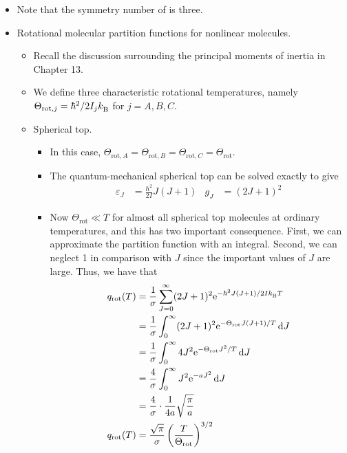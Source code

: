 \documentclass[../notes.tex]{subfiles}
\begin{document}
\begin{itemize}
\begin{itemize}
    \end{itemize}
    \item Note that the symmetry number of  is three.
    \item Rotational molecular partition functions for nonlinear molecules.
    \begin{itemize}
        \item Recall the discussion surrounding the principal moments of inertia in Chapter 13.
        \item We define three characteristic rotational temperatures, namely $\Theta_{\text{rot},j}=\hbar^2/2I_j\kB$ for $j=A,B,C$.
        \item Spherical top.
        \begin{itemize}
            \item In this case, $\Theta_{\text{rot},A}=\Theta_{\text{rot},B}=\Theta_{\text{rot},C}=\Theta_\text{rot}$.
            \item The quantum-mechanical spherical top can be solved exactly to give
            \begin{align*}
                \varepsilon_J &= \frac{\hbar^2}{2I}J(J+1)&
                g_J &= (2J+1)^2
            \end{align*}
            \item Now $\Theta_\text{rot}\ll T$ for almost all spherical top molecules at ordinary temperatures, and this has two important consequence. First, we can approximate the partition function with an integral. Second, we can neglect 1 in comparison with $J$ since the important values of $J$ are large. Thus, we have that
            \begingroup
            \allowdisplaybreaks
            \begin{align*}
                q_\text{rot}(T) &= \frac{1}{\sigma}\sum_{J=0}^\infty(2J+1)^2\e[-\hbar^2J(J+1)/2I\kB T]\\
                &= \frac{1}{\sigma}\int_0^\infty(2J+1)^2\e[-\Theta_\text{rot}J(J+1)/T]\dd{J}\\
                &= \frac{1}{\sigma}\int_0^\infty 4J^2\e[-\Theta_\text{rot}J^2/T]\dd{J}\\
                &= \frac{4}{\sigma}\int_0^\infty J^2\e[-aJ^2]\dd{J}\\
                &= \frac{4}{\sigma}\cdot\frac{1}{4a}\sqrt{\frac{\pi}{a}}\\
                q_\text{rot}(T) &= \frac{\sqrt{\pi}}{\sigma}\left( \frac{T}{\Theta_\text{rot}} \right)^{3/2}
            \end{align*}
            \endgroup

\end{itemize}
\end{itemize}
\end{itemize}
\end{document}

